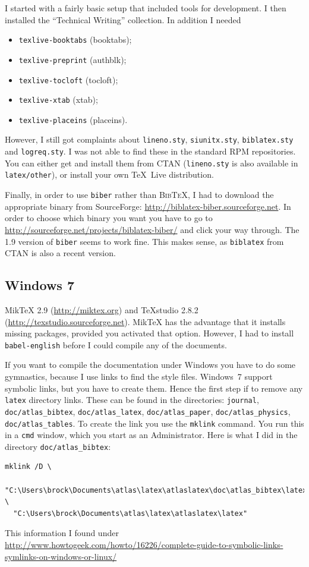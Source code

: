 \documentclass[atlasstyle,UKenglish]{latex/atlasdoc}
\newcommand{\BibTeX}{\textsc{Bib\TeX}}
\newcommand{\File}[1]{\texttt{#1}\xspace}
\newcommand{\Package}[1]{\texttt{#1}\xspace}
\begin{document}
I started with a fairly basic setup that included tools for development.
I then installed the \enquote{Technical Writing} collection.
In addition I needed 
\begin{itemize}\setlength{\parskip}{0pt}\setlength{\itemsep}{0pt}
\item \Package{texlive-booktabs} (booktabs);
\item \Package{texlive-preprint} (authblk);
\item \Package{texlive-tocloft} (tocloft);
\item \Package{texlive-xtab} (xtab);
\item \Package{texlive-placeins} (placeins).
\end{itemize}
However, I still got complaints about \File{lineno.sty}, \File{siunitx.sty},
\File{biblatex.sty} and \File{logreq.sty}.
I was not able to find these in the standard RPM repositories.
You can either get and install them from CTAN (\File{lineno.sty} is also available in \File{latex/other}),
or install your own \TeX\ Live distribution.

Finally, in order to use \Package{biber} rather than \BibTeX,
I had to download the appropriate binary from SourceForge:
\url{http://biblatex-biber.sourceforge.net}.
In order to choose which binary you want you have to go to
\url{http://sourceforge.net/projects/biblatex-biber/} and click your way through.
The 1.9 version of \Package{biber} seems to work fine.
This makes sense, as \Package{biblatex} from CTAN is also a recent version.


\subsection{Windows 7}

MikTeX 2.9 (\url{http://miktex.org}) and TeXstudio 2.8.2 (\url{http://texstudio.sourceforge.net}).
MikTeX has the advantage that it installs missing packages, provided you activated that option.
However, I had to install \Package{babel-english} before I could compile any of the documents.

If you want to compile the documentation under Windows you have to do some gymnastics,
because I use links to find the style files.
Windows~7 support symbolic links, but you have to create them.
Hence the first step if to remove any \texttt{latex} directory links.
These can be found in the directories: 
\File{journal}, \File{doc/atlas\_bibtex}, \File{doc/atlas\_latex}, \File{doc/atlas\_paper}, 
\File{doc/atlas\_physics}, \File{doc/atlas\_tables}.
To create the link you use the \Package{mklink} command.
You run this in a \Package{cmd} window, which you start as an Administrator.
Here is what I did in the directory \File{doc/atlas\_bibtex}:
\begin{verbatim}
mklink /D \
  "C:\Users\brock\Documents\atlas\latex\atlaslatex\doc\atlas_bibtex\latex" \
  "C:\Users\brock\Documents\atlas\latex\atlaslatex\latex"
\end{verbatim}
This information I found under\\
{\footnotesize \url{http://www.howtogeek.com/howto/16226/complete-guide-to-symbolic-links-symlinks-on-windows-or-linux/}}
\end{document}

